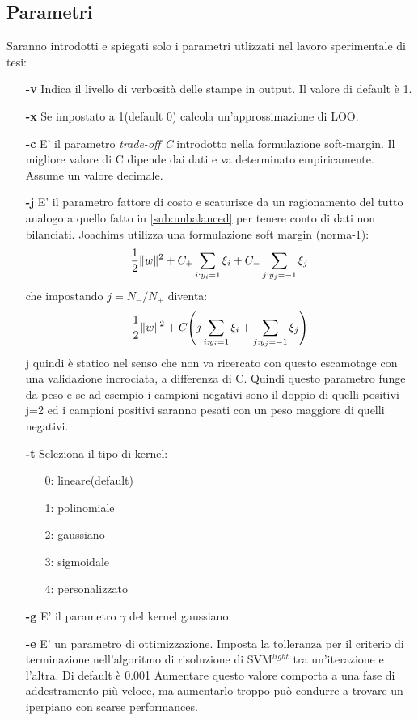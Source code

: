 \subsection{Parametri}
Saranno introdotti e spiegati solo i parametri utlizzati nel lavoro sperimentale di tesi:\\
\begin{itemize}
\item [\textbf{-v}] Indica il livello di verbosità delle stampe in output. Il valore di default è 1.
\item [\textbf{-x}] Se impostato a 1(default 0) calcola un'approssimazione di LOO.
\item [\textbf{-c}]  E' il parametro \textit{trade-off C} introdotto nella formulazione soft-margin. Il migliore valore di C dipende dai dati e va determinato empiricamente. Assume un valore decimale.
\item [\textbf{-j}] E' il parametro fattore di costo e scaturisce da un ragionamento del tutto analogo a quello fatto in \ref{sub:unbalanced} per tenere conto di dati non bilanciati. Joachims utilizza una formulazione  soft margin (norma-1):\begin{equation*}\frac{1}{2}\lVert w\rVert^2 + C_{+}\sum_{i:y_i=1}\xi_i + C_{-}\sum_{j:y_j=-1}\xi_j\end{equation*} che impostando $j=N_-/N_+$ diventa:
\begin{equation*}
\frac{1}{2}\lVert w\rVert^2 +C\Biggl(j\sum_{i:y_i=1}\xi_i + \sum_{j:y_j=-1}\xi_j\Biggl)
\end{equation*}
j quindi è statico nel senso che non va ricercato con questo escamotage con una validazione incrociata, a differenza di C. Quindi questo parametro funge da peso e se ad esempio i campioni negativi sono il doppio di quelli positivi j=2 ed i campioni positivi saranno pesati con un peso maggiore di quelli negativi.
\item [\textbf{-t}] Seleziona il tipo di kernel:
\begin{itemize}
\item[0:] lineare(default)
\item[1:] polinomiale
\item[2:] gaussiano
\item[3:] sigmoidale
\item[4:] personalizzato

\end{itemize}
\item[\textbf{-g}] E' il parametro $\gamma$ del kernel gaussiano.
\item[\textbf{-e}] E' un parametro di ottimizzazione. Imposta la tolleranza per il criterio di terminazione nell'algoritmo di risoluzione di SVM$^{light}$ tra un'iterazione e l'altra. Di default è 0.001 Aumentare questo valore comporta a una fase di addestramento più veloce, ma aumentarlo troppo può condurre a trovare un iperpiano con scarse performances.
\end{itemize}

